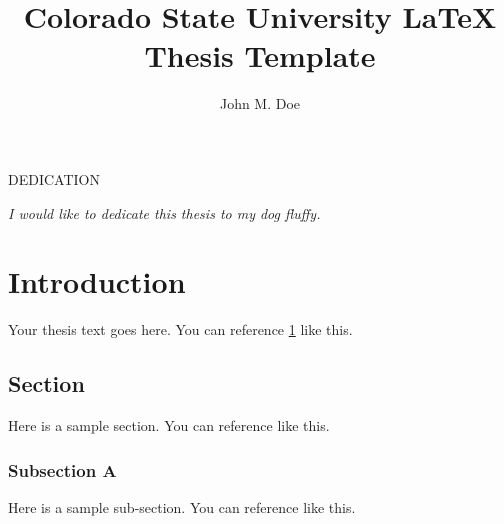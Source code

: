 \documentclass[master]{thesis}
\title{Colorado State University \LaTeX{} Thesis Template}
\author{John M. Doe}
\begin{document}

\frontmatter %

\maketitle
\makemycopyright
\makeabstract
\makeacknowledgements
\tableofcontents
\listoftables
\listoffigures

\begin{center}

    DEDICATION

    \vfill %
    \noindent \textit{I would like to dedicate this thesis to my dog fluffy.}
    \vfill
\end{center}
\newpage

\mainmatter %

\chapter{Introduction}
\label{chap:intro} %

Your thesis text goes here.  You can reference \cref{chap:intro} like this.

\section{Section}
\label{sec:intro:section}

Here is a sample section.  You can reference  like this.

\subsection{Subsection A}
\label{sec:intro:section:subsection}

Here is a sample sub-section.  You can reference  like this.
\end{document}
